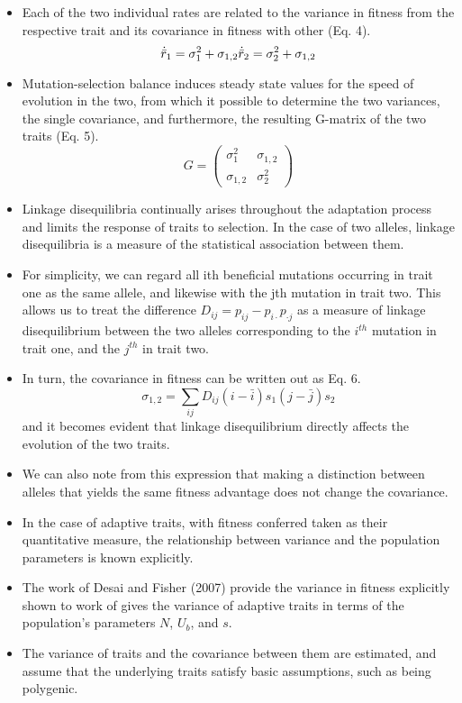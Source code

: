 \documentclass[12pt,one column]{article}
\begin{document}
\begin{itemize}
\begin{itemize}
		\item Each of the two individual rates are related to the variance in fitness from the respective trait and its covariance in fitness with other (Eq. 4). \[ \dot{\bar{r}}_1=\sigma_1^2+\sigma_{1,2}\\ \dot{\bar{r}}_2=\sigma_2^2+\sigma_{1,2} \]
		\item Mutation-selection balance induces steady state values for the speed of evolution in the two, from which it possible to determine the two variances, the single covariance, and furthermore, the resulting G-matrix of the two traits (Eq. 5). \[ G= \left( \begin{array}{cc} \sigma_1^2& \sigma_{1,2}\\ \sigma_{1,2} & \sigma_2^2 \end{array} \right) \]
		\item Linkage disequilibria continually arises throughout the adaptation process and limits the response of traits to selection. In the case of two alleles, linkage disequilibria is a measure of the statistical association between them. 
		\item For simplicity, we can regard all ith beneficial mutations occurring in trait one as the same allele, and likewise with the jth mutation in trait two. This allows us to treat the difference $D_{ij}=p_{ij}-p_{i\cdot} p_{\cdot j}$ as a measure of linkage disequilibrium between the two alleles corresponding to the $i^{th}$ mutation in trait one, and the $j^{th}$ in trait two. 
		\item In turn, the covariance in fitness can be written out as Eq. 6. \[ \sigma_{1,2}=\sum_{ij}D_{ij}(i-\bar{i})s_1 (j-\bar{j}) s_2 \] and it becomes evident that linkage disequilibrium directly affects the evolution of the two traits.
		\item We can also note from this expression that making a distinction between alleles that yields the same fitness advantage does not change the covariance.
		\item In the case of adaptive traits, with fitness conferred taken as their quantitative measure, the relationship between variance and the population parameters is known explicitly. 
		\item The work of Desai and Fisher (2007) provide the variance in fitness explicitly shown to work of gives the variance of adaptive traits in terms of the population’s parameters $N$, $U_b$, and $s$. 
		\item The variance of traits and the covariance between them are estimated, and assume that the underlying traits satisfy basic assumptions, such as being polygenic. 

\end{itemize}
\end{itemize}
\end{document}
